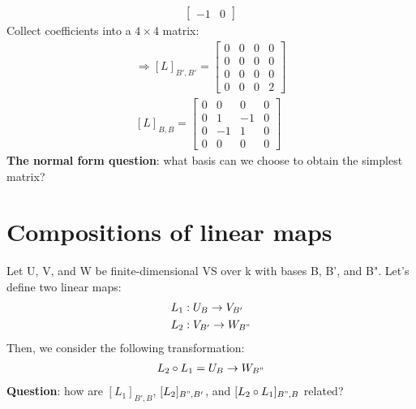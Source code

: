 \documentclass[a4paper, 12pt]{article}
\theoremstyle{definition}
\theoremstyle{definition}
\theoremstyle{definition}
\theoremstyle{definition}
\begin{document}
{\begin{align*}
\begin{bmatrix}
		-1 & 0 
	\end{bmatrix}
\end{align*} 
Collect coefficients into a $4 \times 4$ matrix: 
\begin{align*}
	\Rightarrow [L]_{B',B'} = \begin{bmatrix}
		0 & 0 & 0 & 0 \\
		0 & 0 & 0 & 0 \\
		0 & 0 & 0 & 0 \\
		0 & 0 & 0 & 2 
	\end{bmatrix} \\
	[L]_{B,B} = \begin{bmatrix}
		0 & 0 & 0 & 0 \\
		0 & 1 & -1 & 0 \\
		0 & -1 & 1 & 0 \\
		0 & 0 & 0 & 0 
	\end{bmatrix}
\end{align*}
\textbf{The normal form question}: what basis can we choose to obtain the simplest matrix? 
\section{Compositions of linear maps}
Let U, V, and W be finite-dimensional VS over k with bases B, B', and B". Let's define two linear maps: 
\begin{align*}
	& L_1: U_B \rightarrow V_{B'} \\
	& L_2: V_{B'} \rightarrow W_{B"} 
\end{align*}
Then, we consider the following transformation: 
\begin{align*}
	L_2 \circ L_1 = U_B \rightarrow W_{B"} 
\end{align*}
\textbf{Question}: how are $[L_1]_{B',B}$, $[L_2]_{B",B'}$, and $[L_2 \circ L_1]_{B", B}$ related? 

}
\end{document}

